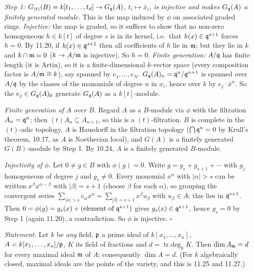 \documentclass[11pt]{article}
\begin{document}
\emph{Step 1: $G_{(t)}(B)=k[t_1,\dots,t_d]\to G_\mathfrak q(A)$, $t_i\mapsto\bar x_i$, is injective and makes $G_\mathfrak q(A)$ a finitely generated module.} This is the map induced by $\phi$ on associated graded rings. \emph{Injective:} the map is graded, so it suffices to show that no non-zero homogeneous $h\in k[t]$ of degree $s$ is in its kernel, i.e.\ that $h(x)\in\mathfrak q^{s+1}$ forces $h=0$. By 11.20, if $h(x)\in\mathfrak q^{s+1}$ then all coefficients of $h$ lie in $\mathfrak m$; but they lie in $k$ and $k\cap\mathfrak m=0$ ($k\to A/\mathfrak m$ is injective). So $h=0$. \emph{Finite generation:} $A/\mathfrak q$ has finite length (it is Artin), so it is a finite-dimensional $k$-vector space (every composition factor is $A/\mathfrak m\cong k$), say spanned by $e_1,\dots,e_N$. $G_\mathfrak q(A)_n=\mathfrak q^n/\mathfrak q^{n+1}$ is spanned over $A/\mathfrak q$ by the classes of the monomials of degree $n$ in $x_i$, hence over $k$ by $e_j\cdot\bar x^\alpha$. So the $e_j\in G_\mathfrak q(A)_0$ generate $G_\mathfrak q(A)$ as a $k[t]$-module.

\emph{Finite generation of $A$ over $B$.} Regard $A$ as a $B$-module via $\phi$ with the filtration $A_n=\mathfrak q^n$; then $(t)A_n\subseteq A_{n+1}$, so this is a $(t)$-filtration. $B$ is complete in the $(t)$-adic topology, $A$ is Hausdorff in the filtration topology ($\bigcap\mathfrak q^n=0$ by Krull's theorem, 10.17, as $A$ is Noetherian local), and $G(A)$ is a finitely generated $G(B)$-module by Step 1. By 10.24, $A$ is a finitely generated $B$-module.

\emph{Injectivity of $\phi$.} Let $0\ne g\in B$ with $\phi(g)=0$. Write $g=g_s+g_{s+1}+\cdots$ with $g_j$ homogeneous of degree $j$ and $g_s\ne0$. Every monomial $x^\alpha$ with $|\alpha|>s$ can be written $x^\beta x^{\alpha-\beta}$ with $|\beta|=s+1$ (choose $\beta$ for each $\alpha$), so grouping the convergent series $\sum_{|\alpha|>s}c_\alpha x^\alpha=\sum_{|\beta|=s+1}x^\beta u_\beta$ with $u_\beta\in A$; this lies in $\mathfrak q^{s+1}$. Then $0=\phi(g)=g_s(x)+(\text{element of }\mathfrak q^{s+1})$ gives $g_s(x)\in\mathfrak q^{s+1}$, hence $g_s=0$ by Step 1 (again 11.20), a contradiction. So $\phi$ is injective. \hfill$\square$

\pf
\emph{Statement.} Let $k$ be \emph{any} field, $\mathfrak p$ a prime ideal of $k[x_1,\dots,x_n]$, $A=k[x_1,\dots,x_n]/\mathfrak p$, $K$ its field of fractions and $d=\operatorname{tr.deg}_kK$. Then $\dim A_\mathfrak m=d$ for every maximal ideal $\mathfrak m$ of $A$; consequently $\dim A=d$. (For $k$ algebraically closed, maximal ideals are the points of the variety, and this is 11.25 and 11.27.)
\end{document}
